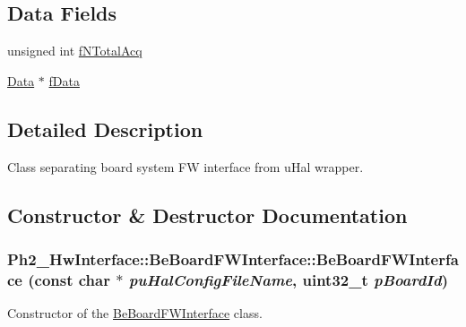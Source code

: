 \subsection*{Data Fields}
\begin{CompactItemize}
\item 
unsigned int \hyperlink{class_ph2___hw_interface_1_1_be_board_f_w_interface_9cc80365ec331732245553a8bc0024ab}{f\-NTotal\-Acq}
\item 
\hyperlink{class_ph2___hw_interface_1_1_data}{Data} $\ast$ \hyperlink{class_ph2___hw_interface_1_1_be_board_f_w_interface_9b315d4b61df34d093ed35cfef755a0f}{f\-Data}
\end{CompactItemize}


\subsection{Detailed Description}
Class separating board system FW interface from u\-Hal wrapper. 



\subsection{Constructor \& Destructor Documentation}
\hypertarget{class_ph2___hw_interface_1_1_be_board_f_w_interface_6a6be2907a3f6494422abb3ae2b35bd1}{
\subsubsection[BeBoardFWInterface]{\setlength{\rightskip}{0pt plus 5cm}Ph2\_\-Hw\-Interface::Be\-Board\-FWInterface::Be\-Board\-FWInterface (const char $\ast$ {\em pu\-Hal\-Config\-File\-Name}, uint32\_\-t {\em p\-Board\-Id})}}
\label{class_ph2___hw_interface_1_1_be_board_f_w_interface_6a6be2907a3f6494422abb3ae2b35bd1}


Constructor of the \hyperlink{class_ph2___hw_interface_1_1_be_board_f_w_interface}{Be\-Board\-FWInterface} class. 


